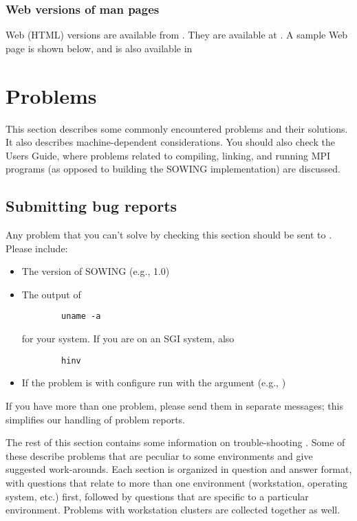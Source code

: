 {\subsubsection{Web versions of man pages}
Web (HTML) versions are available from
.  They are available
at .
A sample Web page is shown below, and is also available in


\section{Problems}
\label{sec:problems}

This section describes some commonly encountered problems and
their solutions.  It also describes machine-dependent considerations.
You should also check the Users Guide, where problems related to compiling,
linking, and running MPI programs (as opposed to building the SOWING
implementation) are  discussed.

\subsection{Submitting bug reports}
\label{sec:bugreports}
Any problem that you can't solve by checking this section should be sent to
.  
Please include:
\begin{itemize}
\item     The version of SOWING (e.g., 1.0)

\item     The output of 
\begin{verbatim}
        uname -a
\end{verbatim}
     for your system.  If you are on an SGI system, also
\begin{verbatim}
        hinv
\end{verbatim}

\item     If the problem is with configure  run with the  argument 
     (e.g.,  )

\end{itemize}
If you have more than one problem, please
send them in separate messages; this simplifies our handling of problem
reports. 
 
The rest of this  section contains some information on trouble-shooting
\sowing. 
Some of 
these describe problems that are peculiar to some environments and give
suggested work-arounds.
Each section is organized in question and answer format, with questions that
relate to more than one environment (workstation, operating system, etc.)
first, followed by questions that are specific to a particular environment.
Problems with workstation clusters are collected together as well.

}
